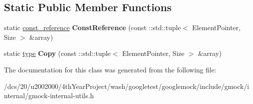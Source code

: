 \subsection*{Static Public Member Functions}
\begin{DoxyCompactItemize}
\item 
\mbox{\label{classtesting_1_1internal_1_1StlContainerView_3_01_1_1std_1_1tuple_3_01ElementPointer_00_01Size_01_4_01_4_af58cbd5be79a8884b3425d39465f4bce}} 
static \mbox{\hyperlink{classtesting_1_1internal_1_1NativeArray}{const\+\_\+reference}} {\bfseries Const\+Reference} (const \+::std\+::tuple$<$ Element\+Pointer, Size $>$ \&array)
\item 
\mbox{\label{classtesting_1_1internal_1_1StlContainerView_3_01_1_1std_1_1tuple_3_01ElementPointer_00_01Size_01_4_01_4_acd52f4f1bbc1fe4341e8f60e6d5f0190}} 
static \mbox{\hyperlink{classtesting_1_1internal_1_1NativeArray}{type}} {\bfseries Copy} (const \+::std\+::tuple$<$ Element\+Pointer, Size $>$ \&array)
\end{DoxyCompactItemize}


The documentation for this class was generated from the following file\+:\begin{DoxyCompactItemize}
\item 
/dcs/20/u2002000/4th\+Year\+Project/wash/googletest/googlemock/include/gmock/internal/gmock-\/internal-\/utils.\+h\end{DoxyCompactItemize}
